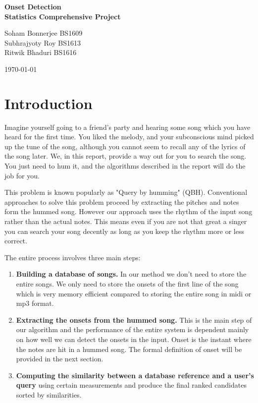 \documentclass[10pt]{article}
\newcounter{count}
\begin{document}
\begin{titlepage}
    \centering
    \vspace*{\fill}

    \vspace*{0.5cm}

    \huge\bfseries
    Onset Detection\\
    \Large Statistics Comprehensive Project 

    \vspace*{1cm}

    \large Soham Bonnerjee   BS1609\\
    \large Subhrajyoty Roy   BS1613\\
    \large Ritwik Bhaduri    BS1616\\
    \vspace*{0.1 cm}
    
    \today
    \vspace*{0.1 cm}

    \vspace*{\fill}
    \end{titlepage}
\setcounter{page}{1}

\section{Introduction}
\qquad Imagine yourself going to a friend's party and hearing some song which you have heard for the first time. You liked the melody, and your subconscious mind picked up the tune of the song, although you cannot seem to recall any of the lyrics of the song later. We, in this report, provide a way out for you to search the song. You just need to hum it, and the algorithms described in the report will do the job for you.

\qquad This problem is known popularly as "Query by humming" (QBH). Conventional approaches to solve this problem proceed by extracting the pitches and notes form the hummed song. However our approach uses the rhythm of the input song rather than the actual notes. This means even if you are not that great a singer you can search your song decently as long as you keep the rhythm more or less correct.

\qquad The entire process involves three main steps:
\begin{enumerate}
    \item \textbf{Building a database of songs.} In our method we don’t need to store the entire songs. We only need to store the onsets of the first line of the song which is very memory efficient compared to storing the entire song in midi or mp3 format.
    \item \textbf{Extracting the onsets from the hummed song.} This is the main step of our algorithm and the performance of the entire system is dependent mainly on how well we can detect the onsets in the input. Onset is the instant where the notes are hit in a hummed song. The formal definition of onset will be provided in the next section.
    \item \textbf{Computing the similarity between a database reference and a user’s query} using certain measurements and produce the final ranked candidates sorted by similarities.
\end{enumerate}
\end{document}
